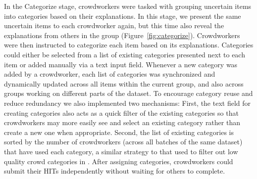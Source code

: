 In the Categorize stage, crowdworkers were tasked with grouping uncertain items into categories based on their explanations. In this stage, we present the same uncertain items to each crowdworker again, but this time also reveal the explanations from others in the group (Figure~\ref{fig:categorize}). Crowdworkers were then instructed to categorize each item based on its explanations. Categories could either be selected from a list of existing categories presented next to each item or added manually via a text input field. Whenever a new category was added by a crowdworker, each list of categories was synchronized and dynamically updated across all items within the current group, and also across groups working on different parts of the dataset. To encourage category reuse and reduce redundancy we also implemented two mechanisms: First, the text field for creating categories also acts as a quick filter of the existing categories so that crowdworkers may more easily see and select an existing category rather than create a new one when appropriate. Second, the list of existing categories is sorted by the number of crowdworkers (across all batches of the same dataset) that have used each category, a similar strategy to that used to filter out low quality crowd categories in \cite{cascade,chilton2014frenzy}. %
After assigning categories, crowdworkers could submit their HITs independently without waiting for others to complete.  
 

